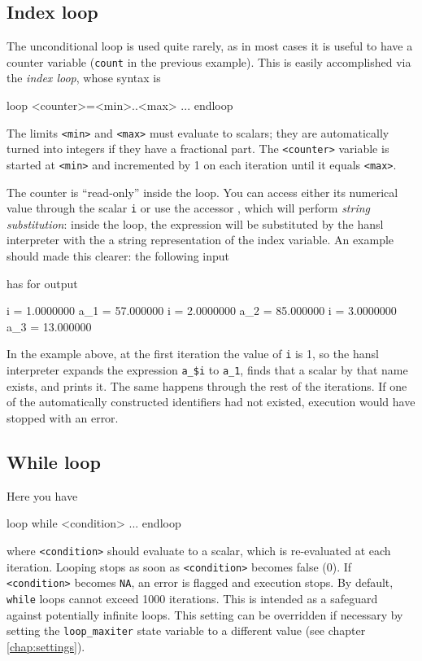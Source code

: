 \subsection{Index loop}

The unconditional loop is used quite rarely, as in most cases it is
useful to have a counter variable (\texttt{count} in the previous
example). This is easily accomplished via the \emph{index loop}, whose
syntax is
\begin{code}
loop <counter>=<min>..<max>
   ...
endloop
\end{code}
The limits \texttt{<min>} and \texttt{<max>} must evaluate to scalars;
they are automatically turned into integers if they have a fractional
part. The \texttt{<counter>} variable is started at \texttt{<min>} and
incremented by 1 on each iteration until it equals \texttt{<max>}.

The counter is ``read-only'' inside the loop. You can access either
its numerical value through the scalar \texttt{i} or use the accessor
, which will perform \emph{string substitution}: inside the
loop, the expression  will be substituted by the hansl
interpreter with the a string representation of the index variable. An
example should made this clearer: the following input
has for output
\begin{code}
    i = 1.0000000
  a_1 = 57.000000
    i = 2.0000000
  a_2 = 85.000000
    i = 3.0000000
  a_3 = 13.000000
\end{code}

In the example above, at the first iteration the value of \texttt{i}
is 1, so the hansl interpreter expands the expression \verb|a_$i| to
\verb|a_1|, finds that a scalar by that name exists, and prints
it. The same happens through the rest of the iterations. If one of the
automatically constructed identifiers had not existed, execution would
have stopped with an error.

\subsection{While loop}

Here you have
\begin{code}
loop while <condition>
   ...
endloop
\end{code}
where \texttt{<condition>} should evaluate to a scalar, which is
re-evaluated at each iteration. Looping stops as soon as
\texttt{<condition>} becomes false (0). If \texttt{<condition>}
becomes \texttt{NA}, an error is flagged and execution stops.  By
default, \texttt{while} loops cannot exceed 1000 iterations. This is
intended as a safeguard against potentially infinite loops. This
setting can be overridden if necessary by setting the
\texttt{loop\_maxiter} state variable to a different value (see
chapter \ref{chap:settings}).

